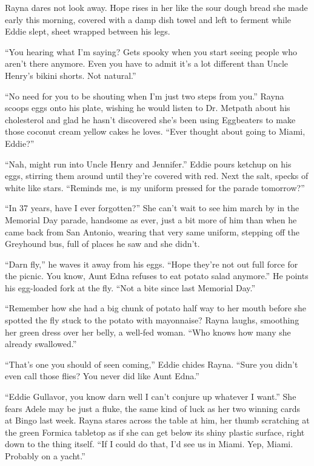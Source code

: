 \documentclass[
]{article}
\begin{document}
Rayna dares not look away. Hope rises in her like the sour dough bread
she made early this morning, covered with a damp dish towel and left to
ferment while Eddie slept, sheet wrapped between his legs.

``You hearing what I'm saying? Gets spooky when you start seeing people
who aren't there any­more. Even you have to admit it's a lot different
than Uncle Henry's bikini shorts. Not natural.''

``No need for you to be shouting when I'm just two steps from you.''
Rayna scoops eggs onto his plate, wishing he would listen to Dr. Metpath
about his cholesterol and glad he hasn't discovered she's been using
Eggbeaters to make those coconut cream yellow cakes he loves. ``Ever
thought about going to Miami, Eddie?''

``Nah, might run into Uncle Henry and Jennifer.'' Eddie pours ketchup on
his eggs, stirring them around until they're covered with red. Next the
salt, specks of white like stars. ``Reminds me, is my uniform pressed
for the parade tomorrow?''

``In 37 years, have I ever forgotten?'' She can't wait to see him march
by in the Memorial Day parade, handsome as ever, just a bit more of him
than when he came back from San Antonio, wearing that very same uniform,
stepping off the Greyhound bus, full of places he saw and she didn't.

``Darn fly,'' he waves it away from his eggs. ``Hope they're not out
full force for the picnic. You know, Aunt Edna refuses to eat potato
salad anymore.'' He points his egg-loaded fork at the fly. ``Not a bite
since last Memorial Day.''

``Remember how she had a big chunk of potato half way to her mouth
before she spotted the fly stuck to the potato with mayonnaise? Rayna
laughs, smoothing her green dress over her belly, a well-fed woman.
``Who knows how many she already swallowed.''

``That's one you should of seen coming,'' Eddie chides Rayna. ``Sure you
didn't even call those flies? You never did like Aunt Edna.''

``Eddie Gullavor, you know darn well I can't conjure up whatever I
want.'' She fears Adele may be just a fluke, the same kind of luck as
her two winning cards at Bingo last week. Rayna stares across the table
at him, her thumb scratching at the green Formica tabletop as if she can
get below its shiny plastic surface, right down to the thing itself.
``If I could do that, I'd see us in Miami. Yep, Miami. Probably on a
yacht.''
\end{document}
